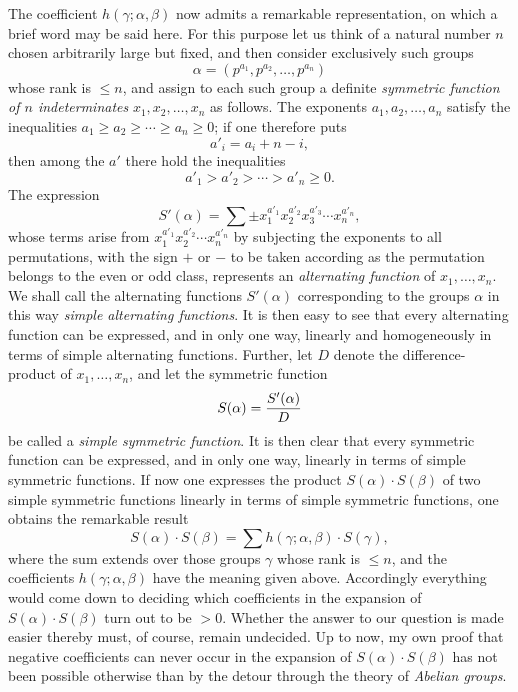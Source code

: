 \documentclass[11pt,a4paper]{article}
\begin{document}
The coefficient $h(\gamma;\alpha,\beta)$ now admits a remarkable representation, on which a brief word may be said here. For this purpose let us think of a natural number $n$ chosen arbitrarily large but fixed, and then consider exclusively such groups
\[
 \alpha=(p^{a_1},p^{a_2},\ldots,p^{a_n})
\]
whose rank is $\leq n$, and assign to each such group a definite \emph{symmetric function of $n$ indeterminates} $x_1,x_2,\ldots,x_n$ as follows. The exponents $a_1,a_2,\ldots,a_n$ satisfy the inequalities $a_1\geq a_2\geq\cdots\geq a_n\geq0$; if one therefore puts
\[
 a'_i=a_i+n-i,
\]
then among the $a'$ there hold the inequalities
\[
 a'_1>a'_2>\cdots>a'_n\geq0.
\]
The expression
\[
 S'(\alpha)=\sum \pm x_1^{a'_1}x_2^{a'_2}x_3^{a'_3}\cdots x_n^{a'_n},
\]
whose terms arise from $x_1^{a'_1}x_2^{a'_2}\cdots x_n^{a'_n}$ by subjecting the exponents to all permutations, with the sign $+$ or $-$ to be taken according as the permutation belongs to the even or odd class, represents an \emph{alternating function} of $x_1,\ldots,x_n$. We shall call the alternating functions $S'(\alpha)$ corresponding to the groups $\alpha$ in this way \emph{simple alternating functions}. It is then easy to see that every alternating function can be expressed, and in only one way, linearly and homogeneously in terms of simple alternating functions. Further, let $D$ denote the difference-product of $x_1,\ldots,x_n$, and let the symmetric function
\[
 S(\alpha)={S'(\alpha)\over D}
\]
be called a \emph{simple symmetric function}. It is then clear that every symmetric function can be expressed, and in only one way, linearly in terms of simple symmetric functions. If now one expresses the product $S(\alpha)\cdot S(\beta)$ of two simple symmetric functions linearly in terms of simple symmetric functions, one obtains the remarkable result
\[
 S(\alpha)\cdot S(\beta)=\sum h(\gamma;\alpha,\beta)\cdot S(\gamma),
\]
where the sum extends over those groups $\gamma$ whose rank is $\leq n$, and the coefficients $h(\gamma;\alpha,\beta)$ have the meaning given above. Accordingly everything would come down to deciding which coefficients in the expansion of $S(\alpha)\cdot S(\beta)$ turn out to be $>0$. Whether the answer to our question is made easier thereby must, of course, remain undecided. Up to now, my own proof that negative coefficients can never occur in the expansion of $S(\alpha)\cdot S(\beta)$ has not been possible otherwise than by the detour through the theory of \emph{Abelian groups}.
\end{document}

